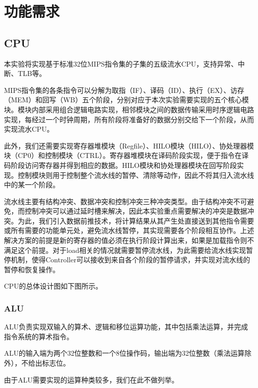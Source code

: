 \section{功能需求}
\subsection{CPU}
本实验将实现基于标准32位MIPS指令集的子集的五级流水CPU，支持异常、中断、TLB等。

MIPS指令集的各条指令可以分解为取指（IF）、译码（ID）、执行（EX）、访存（MEM）和回写（WB）五个阶段，分别对应于本次实验需要实现的五个核心模块。模块内部采用组合逻辑电路实现，相邻模块之间的数据传输采用时序逻辑电路实现，每经过一个时钟周期，所有阶段将准备好的数据分别交给下一个阶段，从而实现流水CPU。

此外，我们还需要实现寄存器堆模块（Regfile）、HILO模块（HILO）、协处理器模块（CP0）和控制模块（CTRL）。寄存器堆模块在译码阶段实现，便于指令在译码阶段访问寄存器并得到相应的数据。HILO模块和协处理器模块在回写阶段实现。控制模块则用于控制整个流水线的暂停、清除等动作，因此不将其归入流水线中的某一个阶段。

流水线主要有结构冲突、数据冲突和控制冲突三种冲突类型。由于结构冲突不可避免，而控制冲突可以通过延时槽来解决，因此本实验重点需要解决的冲突是数据冲突。为此，我们引入数据前推技术，将计算结果从其产生处直接送到其他指令需要或所有需要的功能单元处，避免流水线暂停，其实现需要各个阶段相互协作。上述解决方案的前提是新的寄存器的值必须在执行阶段计算出来，如果是加载指令则不满足这个前提。对于load相关的情况就需要暂停流水线，为此需要给流水线实现暂停机制，使得Controller可以接收到来自各个阶段的暂停请求，并实现对流水线的暂停和恢复操作。

CPU的总体设计图如下图所示。

\subsubsection{ALU}
ALU负责实现双输入的算术、逻辑和移位运算功能，其中包括乘法运算，并完成指令系统的算术指令。

ALU的输入端为两个32位整数和一个8位操作码，输出端为32位整数（乘法运算除外），不给出标志位。

由于ALU需要实现的运算种类较多，我们在此不做列举。



